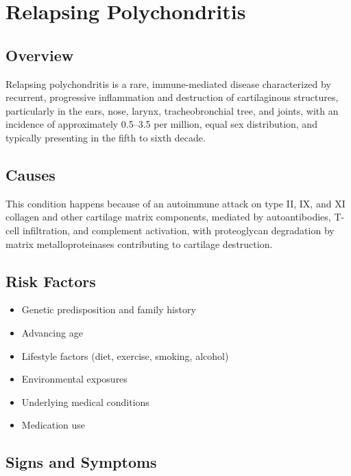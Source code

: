 \chapter{Relapsing Polychondritis}
\label{sec:Relapsing Polychondritis}

\section{Overview}
Relapsing polychondritis is a rare, immune-mediated disease characterized by recurrent, progressive inflammation and destruction of cartilaginous structures, particularly in the ears, nose, larynx, tracheobronchial tree, and joints, with an incidence of approximately 0.5--3.5 per million, equal sex distribution, and typically presenting in the fifth to sixth decade.
\section{Causes}
This condition happens because of an autoimmune attack on type II, IX, and XI collagen and other cartilage matrix components, mediated by autoantibodies, T-cell infiltration, and complement activation, with proteoglycan degradation by matrix metalloproteinases contributing to cartilage destruction.     
\section{Risk Factors}

\begin{itemize}[noitemsep]
  \item Genetic predisposition and family history
  \item Advancing age
  \item Lifestyle factors (diet, exercise, smoking, alcohol)
  \item Environmental exposures
  \item Underlying medical conditions
  \item Medication use
\end{itemize}
\section{Signs and Symptoms}

